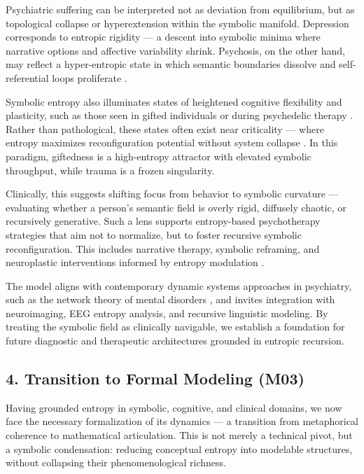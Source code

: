 Psychiatric suffering can be interpreted not as deviation from equilibrium, but as topological collapse or hyperextension within the symbolic manifold. Depression corresponds to entropic rigidity — a descent into symbolic minima where narrative options and affective variability shrink. Psychosis, on the other hand, may reflect a hyper-entropic state in which semantic boundaries dissolve and self-referential loops proliferate \cite{carhart2014, luhrmann2020voices}.

Symbolic entropy also illuminates states of heightened cognitive flexibility and plasticity, such as those seen in gifted individuals or during psychedelic therapy \cite{muthukumaraswamy2013broadband}. Rather than pathological, these states often exist near criticality — where entropy maximizes reconfiguration potential without system collapse \cite{kelso1995dynamic}. In this paradigm, giftedness is a high-entropy attractor with elevated symbolic throughput, while trauma is a frozen singularity.

Clinically, this suggests shifting focus from behavior to symbolic curvature — evaluating whether a person’s semantic field is overly rigid, diffusely chaotic, or recursively generative. Such a lens supports entropy-based psychotherapy strategies that aim not to normalize, but to foster recursive symbolic reconfiguration. This includes narrative therapy, symbolic reframing, and neuroplastic interventions informed by entropy modulation \cite{gallagher2020action, solms2021hidden}.

The model aligns with contemporary dynamic systems approaches in psychiatry, such as the network theory of mental disorders \cite{borsboom2017network}, and invites integration with neuroimaging, EEG entropy analysis, and recursive linguistic modeling. By treating the symbolic field as clinically navigable, we establish a foundation for future diagnostic and therapeutic architectures grounded in entropic recursion.

\subsection*{4. Transition to Formal Modeling (M03)}

Having grounded entropy in symbolic, cognitive, and clinical domains, we now face the necessary formalization of its dynamics — a transition from metaphorical coherence to mathematical articulation. This is not merely a technical pivot, but a symbolic condensation: reducing conceptual entropy into modelable structures, without collapsing their phenomenological richness.


